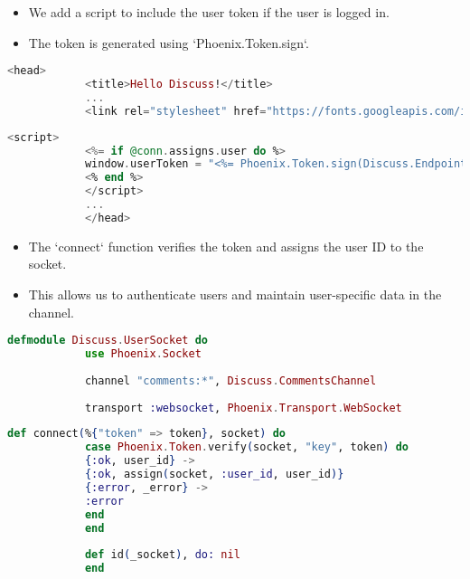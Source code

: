 \documentclass[aspectratio=169, table]{beamer}
\begin{document}
	\begin{frame}[fragile]{}
		\begin{itemize}
			\item We add a script to include the user token if the user is logged in.
			\item The token is generated using `Phoenix.Token.sign`.
		\end{itemize}
		
		\begin{lstlisting}[language=Elixir]
			<head>
			<title>Hello Discuss!</title>
			...
			<link rel="stylesheet" href="https://fonts.googleapis.com/icon?family=Material+Icons">
		\end{lstlisting}
	\end{frame}
	
	\begin{frame}[fragile]{}
		\begin{lstlisting}[language=Elixir]
			<script>
			<%= if @conn.assigns.user do %>
			window.userToken = "<%= Phoenix.Token.sign(Discuss.Endpoint, "key", @conn.assigns.user.id) %>"
			<% end %>
			</script>
			...
			</head>
		\end{lstlisting}
	\end{frame}
	
	\begin{frame}[fragile]{}
		\begin{itemize}
			\item The `connect` function verifies the token and assigns the user ID to the socket.
			\item This allows us to authenticate users and maintain user-specific data in the channel.
		\end{itemize}
		
		\begin{lstlisting}[language=Elixir]
			defmodule Discuss.UserSocket do
			use Phoenix.Socket
			
			channel "comments:*", Discuss.CommentsChannel
			
			transport :websocket, Phoenix.Transport.WebSocket
		\end{lstlisting}
	\end{frame}
	
	\begin{frame}[fragile]{}
		\begin{lstlisting}[language=Elixir]
			def connect(%{"token" => token}, socket) do
			case Phoenix.Token.verify(socket, "key", token) do
			{:ok, user_id} -> 
			{:ok, assign(socket, :user_id, user_id)}
			{:error, _error} ->
			:error
			end
			end
			
			def id(_socket), do: nil
			end
		\end{lstlisting}
	\end{frame}
	
\end{document}
